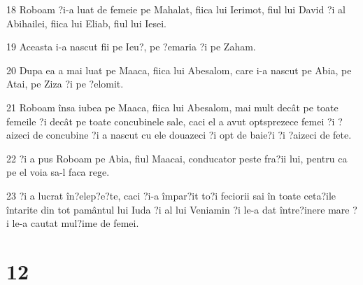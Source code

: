 \par 18 Roboam ?i-a luat de femeie pe Mahalat, fiica lui Ierimot, fiul lui David ?i al Abihailei, fiica lui Eliab, fiul lui Iesei.
\par 19 Aceasta i-a nascut fii pe Ieu?, pe ?emaria ?i pe Zaham.
\par 20 Dupa ea a mai luat pe Maaca, fiica lui Abesalom, care i-a nascut pe Abia, pe Atai, pe Ziza ?i pe ?elomit.
\par 21 Roboam însa iubea pe Maaca, fiica lui Abesalom, mai mult decât pe toate femeile ?i decât pe toate concubinele sale, caci el a avut optsprezece femei ?i ?aizeci de concubine ?i a nascut cu ele douazeci ?i opt de baie?i ?i ?aizeci de fete.
\par 22 ?i a pus Roboam pe Abia, fiul Maacai, conducator peste fra?ii lui, pentru ca pe el voia sa-l faca rege.
\par 23 ?i a lucrat în?elep?e?te, caci ?i-a împar?it to?i feciorii sai în toate ceta?ile întarite din tot pamântul lui Iuda ?i al lui Veniamin ?i le-a dat între?inere mare ?i le-a cautat mul?ime de femei.

\chapter{12}

